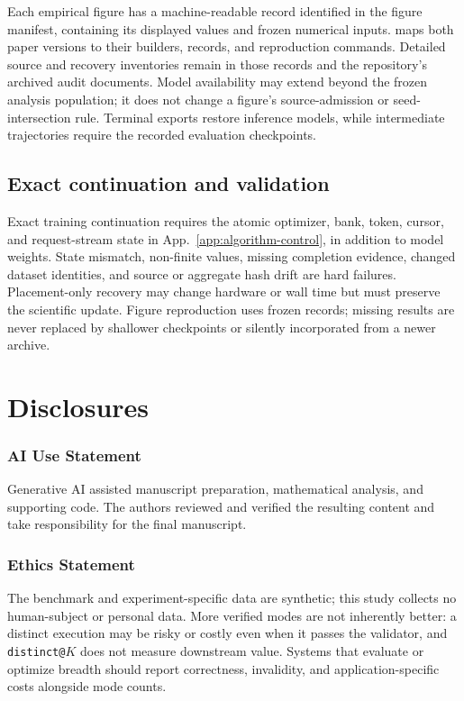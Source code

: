 \documentclass{article}
\newcommand{\1}{\mathbf 1}
\theoremstyle{remark}
\theoremstyle{definition}
\theoremstyle{plain}
\begin{document}
Each empirical figure has a machine-readable record identified in the
figure manifest, containing its displayed values and frozen numerical inputs.
 maps both paper versions to their builders,
records, and reproduction commands. Detailed source and recovery inventories
remain in those records and the repository's archived audit documents.
Model availability may extend beyond the frozen analysis population; it
does not change a figure's source-admission or seed-intersection rule.
Terminal exports restore inference models, while intermediate trajectories
require the recorded evaluation checkpoints.

\subsection{Exact continuation and validation}
\label{app:repro-recovery}

Exact training continuation requires the atomic optimizer, bank, token,
cursor, and request-stream state in App.~\ref{app:algorithm-control},
in addition to model weights. State mismatch, non-finite values, missing
completion evidence, changed dataset identities, and source or aggregate
hash drift are hard failures. Placement-only recovery may change hardware
or wall time but must preserve the scientific update. Figure reproduction
uses frozen records; missing results are never replaced by shallower
checkpoints or silently incorporated from a newer archive.

\section{Disclosures}
\label{app:disclosures}

\subsubsection*{AI Use Statement}
\label{sec:ai-use}

Generative AI assisted manuscript preparation, mathematical analysis, and
supporting code. The authors reviewed and verified the resulting content and
take responsibility for the final manuscript.

\subsubsection*{Ethics Statement}

The benchmark and experiment-specific data are synthetic; this study collects
no human-subject or personal data. More verified modes are not inherently
better: a distinct execution may be risky or costly even when it passes the
validator, and \texttt{distinct@}$K$ does not measure downstream value. Systems
that evaluate or optimize breadth should report correctness, invalidity, and
application-specific costs alongside mode counts.
\end{document}
